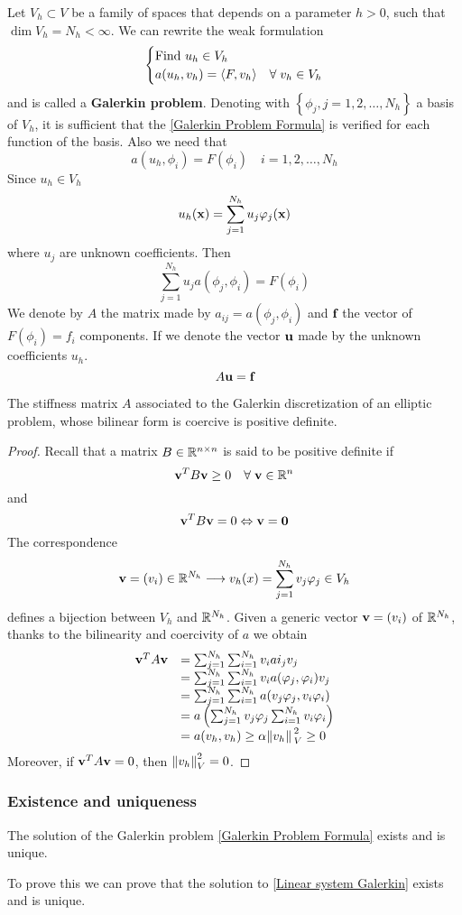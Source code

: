 Let \(V_h \subset V\) be a family of spaces that depends on a parameter \(h > 0\), such that \(\dim V_h = N_h < \infty\).
We can rewrite the weak formulation 
\begin{equation}
    \begin{cases}
        \text{Find } u_h \in V_h\\
        a(u_h,v_h) = \langle F,v_h \rangle & \forall \; v_h \in V_h \label{Galerkin Problem Formula}
    \end{cases}
\end{equation}
and is called a \textbf{Galerkin problem}. Denoting with \(\left\{\phi_j, j = 1,2,\ldots,N_h\right\}\) a basis of \(V_h\), it is sufficient that the \eqref{Galerkin Problem Formula} is verified for each function of the basis. 
Also we need that 
\[
    a(u_h, \phi_i) = F(\phi_i) \quad i = 1, 2, \ldots , N_h
\]
Since \(u_h \in V_h\)
\[
    u_h(\textbf{x})=\sum_{j=1}^{N_h} u_j \varphi_j(\textbf{x})
\]
where \(u_j\) are unknown coefficients. Then
\[
    \sum_{j=1}^{N_h}u_j a(\phi_j, \phi_i) = F(\phi_i)
\]
We denote by \(A\) the matrix made by \(a_{ij} = a(\phi_j, \phi_i)\) and \(\textbf{f}\) the vector of \(F(\phi_i) = f_i\) components. If we denote the vector \(\textbf{u}\) made by the unknown coefficients \(u_h\).
\begin{equation}
    A\textbf{u} = \textbf{f}
    \label{Linear system Galerkin}
\end{equation}
\begin{theorem}
    The stiffness matrix \(A\) associated to the Galerkin discretization of an elliptic problem, whose bilinear form is coercive is positive definite.
\end{theorem}
\begin{proof}
    Recall that a matrix \(B \in \mathbb{R}^{n\times n}\) is said to be positive definite if 
    \[
        \textbf{v}^TB\textbf{v} \geq 0 \quad \forall \; \textbf{v} \in \mathbb{R}^n
    \]
    and
    \[
        \textbf{v}^T B \textbf{v} = 0 \Leftrightarrow \textbf{v} = \textbf{0}
    \]
    The correspondence 
    \[
        \textbf{v} = (v_i) \in \mathbb{R}^{N_h} \longrightarrow v_h(x) = \sum_{j=1}^{N_h} v_j\varphi_j \in V_h
    \]
    defines a bijection between \(V_h\) and \(\mathbb{R}^{N_h}\). Given a generic vector \(\textbf{v} = (v_i)\) of \(\mathbb{R}^{N_h}\), thanks to the bilinearity and coercivity of \(a\) we obtain 
    \[
        \begin{array}{rl}
        \textbf{v}^T A \textbf{v} & = \sum_{j=1}^{N_h}\sum_{i=1}^{N_h} v_i ai_j v_j \\
        & = \sum_{j=1}^{N_h}\sum_{i=1}^{N_h} v_ia(\varphi_j, \varphi_i)v_j\\
        & = \sum_{j=1}^{N_h}\sum_{i=1}^{N_h} a(v_j\varphi_j, v_i \varphi_i)\\
        & = a\left(\sum_{j=1}^{N_h}v_j\varphi_j\sum_{i=1}^{N_h}v_i\varphi_i\right)\\
        & = a(v_h,v_h) \geq \alpha \norm*{v_h}_V^2 \geq 0
        \end{array}
    \]
    Moreover, if \(\textbf{v}^T A \textbf{v} = 0\), then \(\norm{v_h}_V^2 = 0\).
\end{proof}
\subsubsection*{Existence and uniqueness}
\begin{corollary}
    The solution of the Galerkin problem \eqref{Galerkin Problem Formula} exists and is unique.
\end{corollary}
To prove this we can prove that the solution to \eqref{Linear system Galerkin} exists and is unique.
